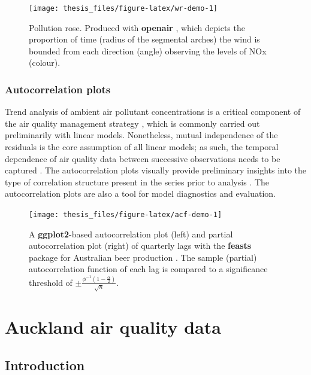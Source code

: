 \documentclass{aucklandthesis}
\begin{document}
\begin{figure}
\texttt{[image: thesis\_files/figure-latex/wr-demo-1]} \caption{Pollution rose. Produced with \textbf{openair} \autocite{openair}, which depicts the proportion of time (radius of the segmental arches) the wind is bounded from each direction (angle) observing the levels of NOx (colour).}\label{fig:wr-demo}
\end{figure}



\hypertarget{autocorrelation-plots}{%
\subsection{Autocorrelation plots}\label{autocorrelation-plots}}

Trend analysis of ambient air pollutant concentrations is a critical component of the air quality management strategy \autocite{aqi}, which is commonly carried out preliminarily with linear models. Nonetheless, mutual independence of the residuals is the core assumption of all linear models; as such, the temporal dependence of air quality data between successive observations needs to be captured \autocite{lm}. The autocorrelation plots visually provide preliminary insights into the type of correlation structure present in the series prior to analysis \autocite{acf}. The autocorrelation plots are also a tool for model diagnostics and evaluation.

\begin{figure}
\texttt{[image: thesis\_files/figure-latex/acf-demo-1]} \caption{A \textbf{ggplot2}-based autocorrelation plot (left) and partial autocorrelation plot (right) of quarterly lags with the \textbf{feasts} package for Australian beer production \autocite{fpp3d}. The sample (partial) autocorrelation function of each lag is compared to a significance threshold of \(\pm \frac{\phi^{-1} (1 - \frac{\alpha}{2})}{\sqrt{n}}\).}\label{fig:acf-demo}
\end{figure}



\hypertarget{ch:data}{%
\chapter{Auckland air quality data}\label{ch:data}}

\hypertarget{introduction}{%
\section{Introduction}\label{introduction}}
\end{document}
